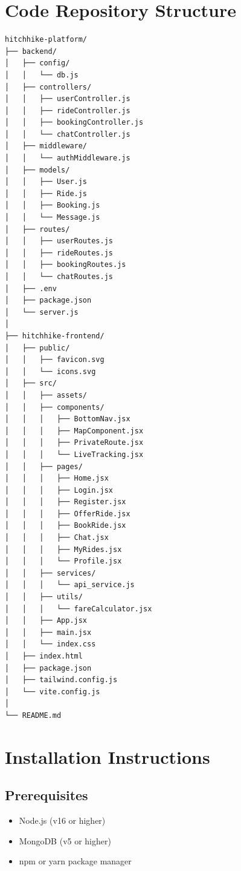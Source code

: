 \documentclass[12pt,a4paper]{article}
\begin{document}
\newpage

\appendix

\section{Code Repository Structure}

\begin{lstlisting}
hitchhike-platform/
├── backend/
│   ├── config/
│   │   └── db.js
│   ├── controllers/
│   │   ├── userController.js
│   │   ├── rideController.js
│   │   ├── bookingController.js
│   │   └── chatController.js
│   ├── middleware/
│   │   └── authMiddleware.js
│   ├── models/
│   │   ├── User.js
│   │   ├── Ride.js
│   │   ├── Booking.js
│   │   └── Message.js
│   ├── routes/
│   │   ├── userRoutes.js
│   │   ├── rideRoutes.js
│   │   ├── bookingRoutes.js
│   │   └── chatRoutes.js
│   ├── .env
│   ├── package.json
│   └── server.js
│
├── hitchhike-frontend/
│   ├── public/
│   │   ├── favicon.svg
│   │   └── icons.svg
│   ├── src/
│   │   ├── assets/
│   │   ├── components/
│   │   │   ├── BottomNav.jsx
│   │   │   ├── MapComponent.jsx
│   │   │   ├── PrivateRoute.jsx
│   │   │   └── LiveTracking.jsx
│   │   ├── pages/
│   │   │   ├── Home.jsx
│   │   │   ├── Login.jsx
│   │   │   ├── Register.jsx
│   │   │   ├── OfferRide.jsx
│   │   │   ├── BookRide.jsx
│   │   │   ├── Chat.jsx
│   │   │   ├── MyRides.jsx
│   │   │   └── Profile.jsx
│   │   ├── services/
│   │   │   └── api_service.js
│   │   ├── utils/
│   │   │   └── fareCalculator.jsx
│   │   ├── App.jsx
│   │   ├── main.jsx
│   │   └── index.css
│   ├── index.html
│   ├── package.json
│   ├── tailwind.config.js
│   └── vite.config.js
│
└── README.md
\end{lstlisting}

\section{Installation Instructions}

\subsection{Prerequisites}
\begin{itemize}
    \item Node.js (v16 or higher)
    \item MongoDB (v5 or higher)
    \item npm or yarn package manager
\end{itemize}
\end{document}
